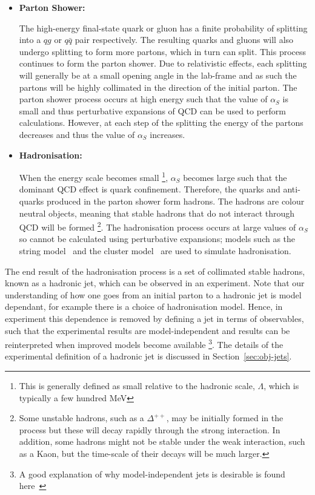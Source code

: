 \begin{itemize}[leftmargin=*]
  
\item\textbf{Parton Shower:}

  The high-energy final-state quark or gluon has a finite probability of splitting into a $qg$ or $q\bar{q}$ pair respectively.
  The resulting quarks and gluons will also undergo splitting to form more partons,
  which in turn can split. This process continues to form the parton shower.
  Due to relativistic effects, each splitting will generally be at a small opening angle in the lab-frame
  and as such the partons will be highly collimated in the direction of the initial parton.
  The parton shower process occurs at high energy such that the value of $\alpha_S$ is small
  and thus perturbative expansions of QCD can be used to perform calculations.
  However, at each step of the splitting the energy of the partons decreases
  and thus the value of $\alpha_S$ increases.\vspace{0.5em}
  
\item\textbf{Hadronisation:}
  
  When the energy scale becomes small
  \footnote{This is generally defined as small relative to the hadronic scale, $\Lambda$, which is typically a few hundred MeV},
  $\alpha_S$ becomes large such that the dominant QCD effect is quark confinement.
  Therefore, the quarks and anti-quarks produced in the parton shower form hadrons.
  The hadrons are colour neutral objects, meaning that stable hadrons that do not interact through QCD will be formed
  \footnote{Some unstable hadrons, such as a $\Delta^{++}$, may be initially formed in the process but these will decay rapidly through the strong interaction.
    In addition, some hadrons might not be stable under the weak interaction, such as a Kaon, but the time-scale of their decays will be much larger.}.
  The hadronisation process occurs at large values of $\alpha_S$ so cannot be calculated using perturbative expansions;
  models such as the string model~\cite{theo-qcd_jet_string} and the
  cluster model~\cite{theo-qcd_jet_cluster} are used to simulate hadronisation.

\end{itemize}
  
The end result of the hadronisation process is a set of collimated stable hadrons,
known as a hadronic jet, which can be observed in an experiment.
Note that our understanding of how one goes from an initial parton to a hadronic jet is model dependant,
for example there is a choice of hadronisation model.
Hence, in experiment this dependence is removed by defining a jet in terms of observables,
such that the experimental results are model-independent and results can be reinterpreted when improved models become available
\footnote{A good explanation of why model-independent jets is desirable is found here~\cite{theo-jets_jb}}.
The details of the experimental definition of a hadronic jet is discussed in Section~\ref{sec:obj-jets}.

